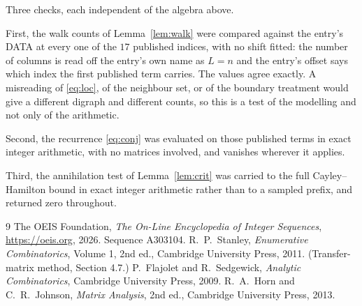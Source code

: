 \documentclass[11pt,a4paper]{article}
\theoremstyle{plain}
\theoremstyle{definition}
\begin{document}
Three checks, each independent of the algebra above.

First, the walk counts of Lemma~\ref{lem:walk} were compared against the entry's DATA at
every one of the $17$ published indices, with no shift fitted: the number of columns is
read off the entry's own name as $L=n$ and the entry's offset says which index the first
published term carries. The values agree exactly. A misreading of \eqref{eq:loc}, of the
neighbour set, or of the boundary treatment would give a different digraph and different
counts, so this is a test of the modelling and not only of the arithmetic.

Second, the recurrence \eqref{eq:conj} was evaluated on those published terms in exact
integer arithmetic, with no matrices involved, and vanishes wherever it applies.

Third, the annihilation test of Lemma~\ref{lem:crit} was carried to the full
Cayley--Hamilton bound in exact integer arithmetic rather than to a sampled prefix, and
returned zero throughout.

\begin{thebibliography}{9}
 The OEIS Foundation, \emph{The On-Line Encyclopedia of Integer
Sequences}, \url{https://oeis.org}, 2026. Sequence A303104.
 R.~P.~Stanley, \emph{Enumerative Combinatorics}, Volume 1, 2nd ed.,
Cambridge University Press, 2011. (Transfer-matrix method, Section 4.7.)
 P.~Flajolet and R.~Sedgewick, \emph{Analytic Combinatorics}, Cambridge
University Press, 2009.
 R.~A.~Horn and C.~R.~Johnson, \emph{Matrix Analysis}, 2nd ed., Cambridge
University Press, 2013.
\end{thebibliography}
\end{document}

